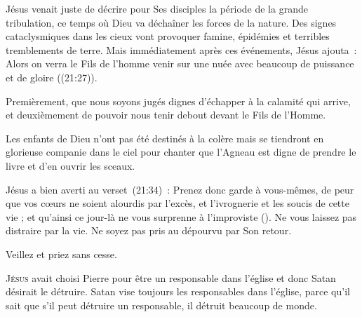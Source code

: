 Jésus venait juste de décrire pour Ses disciples la période
 de la grande tribulation, ce temps où Dieu va déchaîner les forces
 de la nature. Des signes cataclysmiques dans les cieux vont provoquer famine,
 épidémies et terribles tremblements de terre.
 Mais immédiatement après ces événements, Jésus ajouta~: 
 \og Alors on verra le Fils de l'homme venir sur une nuée avec beaucoup
 de puissance et de gloire \fg{} ((21:27)).


Premièrement, que nous soyons jugés dignes d'échapper à la calamité
 qui arrive, et deuxièmement de pouvoir nous tenir debout
 devant le Fils de l'Homme.

Les enfants de Dieu n'ont pas été destinés à la colère mais se tiendront
 en glorieuse companie dans le ciel pour chanter que l'Agneau
 est digne de prendre le livre et d'en ouvrir les sceaux.

Jésus a bien averti au verset~(21:34)~: 
 \og Prenez donc garde à vous-mêmes, de peur que vos cœurs ne soient
 alourdis par l’excès, et l’ivrognerie et les soucis de cette vie ;
 et qu'ainsi ce jour-là ne vous surprenne à l’improviste \fg{} (\KJF).
 Ne vous laissez pas distraire par la vie.
 Ne soyez pas pris au dépourvu par Son retour.

Veillez et priez \ocadr sans cesse.

\dvrule






\lettrine{J}{ésus} avait choisi Pierre pour être un responsable
 dans l'église 
 et donc Satan désirait le détruire.
 Satan vise toujours les responsables dans l'église, 
 parce qu'il sait que s'il peut détruire un responsable,
 il détruit beaucoup de monde.

